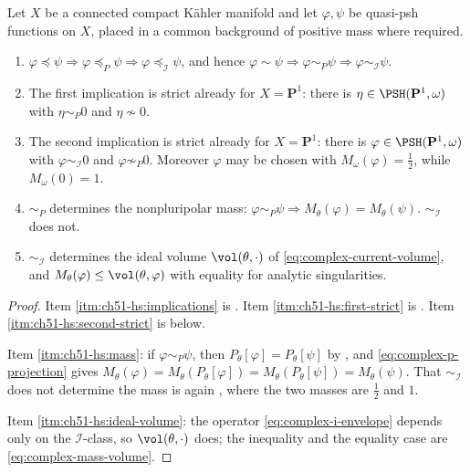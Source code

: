 \begin{theorem}
\label{thm:ch51-hierarchy-strict}
Let \(X\) be a connected compact K\"ahler manifold and let
\(\varphi,\psi\) be quasi-psh functions on \(X\), placed in a common
background of positive mass where required.
\begin{enumerate}
\item\label{itm:ch51-hs:implications}
      \(\varphi\preceq\psi\Rightarrow\varphi\preceq_P\psi
      \Rightarrow\varphi\preceq_{\mathcal I}\psi\), and hence
      \(\varphi\sim\psi\Rightarrow\varphi\sim_P\psi
      \Rightarrow\varphi\sim_{\mathcal I}\psi\).
\item\label{itm:ch51-hs:first-strict}
      The first implication is strict already for \(X=\mathbf P^1\):
      there is \(\eta\in\PSH(\mathbf P^1,\omega)\) with
      \(\eta\sim_P0\) and \(\eta\not\sim0\).
\item\label{itm:ch51-hs:second-strict}
      The second implication is strict already for \(X=\mathbf P^1\):
      there is \(\varphi\in\PSH(\mathbf P^1,\omega)\) with
      \(\varphi\sim_{\mathcal I}0\) and \(\varphi\not\sim_P0\).
      Moreover \(\varphi\) may be chosen with
      \(M_\omega(\varphi)=\tfrac12\), while \(M_\omega(0)=1\).
\item\label{itm:ch51-hs:mass}
      \(\sim_P\) determines the nonpluripolar mass:
      \(\varphi\sim_P\psi\Rightarrow M_\theta(\varphi)=M_\theta(\psi)\).
      \(\sim_{\mathcal I}\) does not.
\item\label{itm:ch51-hs:ideal-volume}
      \(\sim_{\mathcal I}\) determines the ideal volume
      \(\vol(\theta,\cdot)\) of
      \eqref{eq:complex-current-volume}, and
      \(M_\theta(\varphi)\leq\vol(\theta,\varphi)\) with equality for
      analytic singularities.
\end{enumerate}
\end{theorem}

\begin{proof}
Item \cref{itm:ch51-hs:implications} is
.  Item
\cref{itm:ch51-hs:first-strict} is
.  Item
\cref{itm:ch51-hs:second-strict} is  below.

Item \cref{itm:ch51-hs:mass}: if \(\varphi\sim_P\psi\), then
\(P_\theta[\varphi]=P_\theta[\psi]\) by
, and
\eqref{eq:complex-p-projection} gives
\(M_\theta(\varphi)=M_\theta(P_\theta[\varphi])
=M_\theta(P_\theta[\psi])=M_\theta(\psi)\).  That
\(\sim_{\mathcal I}\) does not determine the mass is again
, where the two masses are \(\tfrac12\) and \(1\).

Item \cref{itm:ch51-hs:ideal-volume}: the operator
\eqref{eq:complex-i-envelope} depends only on the
\(\mathcal I\)-class, so \(\vol(\theta,\cdot)\) does; the inequality and
the equality case are \eqref{eq:complex-mass-volume}.
\end{proof}

